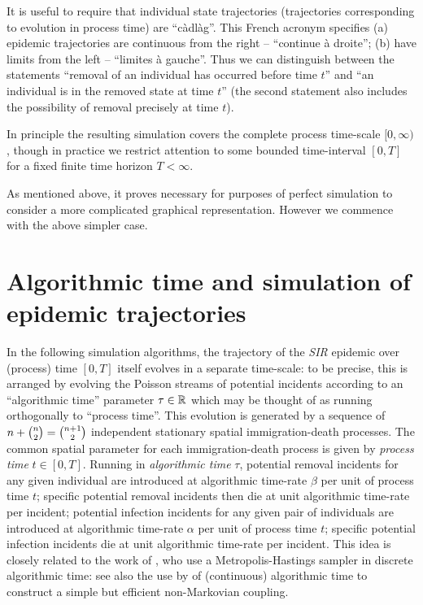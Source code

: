 \documentclass[]{article}
\newcommand{\SIR}{\emph{SIR}\xspace}
\begin{document}
 
It is useful to
 require that
 individual state trajectories 
 (trajectories corresponding to evolution in process time)
 are ``c\`adl\`ag''. 
This French acronym specifies (a) epidemic trajectories are continuous 
 from the right -- ``continue \`a droite'';
(b) have limits from the left -- ``limites \`a gauche''.
Thus we can distinguish between
 the statements
 ``removal of an individual has occurred before time \(t\)''
 and ``an individual is in the removed state 
 at time \(t\)'' (the second statement also
 includes the possibility of removal precisely at time \(t\)).
 
In principle the resulting simulation covers the complete process time-scale \([0,\infty)\),
 though
 in practice we 
 restrict attention to some bounded time-interval \([0,T]\) for a fixed 
 finite time horizon \(T<\infty\).


  As mentioned above, 
  it proves necessary 
  for purposes of perfect simulation
  to consider a more complicated graphical representation.
 However we commence with the above simpler case.
 
 \section{Algorithmic time and simulation of epidemic trajectories}\label{sec:algorithmic}
%
In the following simulation algorithms,
the trajectory of the \SIR epidemic over (process) time \([0,T]\)
itself evolves in a separate time-scale:
to be precise, this is arranged by evolving
the Poisson streams of potential incidents 
according
 to an ``algorithmic time'' parameter \(\tau\in\mathbb{R}\)
 which may be thought of as running orthogonally to ``process time''.
 This evolution is generated by
 a sequence of
 \(n+\tbinom{n}{2}=\tbinom{n+1}{2}\) 
 independent stationary 
 spatial immigration-death processes.
 The common spatial parameter for
 each immigration-death process
 is given by  \emph{process time} \(t\in[0,T]\).
 Running in 
 \emph{algorithmic
 time} \(\tau\), potential removal incidents for any given individual 
 are introduced at algorithmic time-rate \(\beta\) per unit of process time \(t\);
specific potential removal incidents then die at unit algorithmic time-rate per incident;
 potential infection incidents for any given pair of individuals are introduced 
 at algorithmic time-rate \(\alpha\) per unit of process time \(t\); 
specific potential infection incidents die at unit algorithmic time-rate per incident.%
This idea is closely related to the work of 
\citet{GibsonRenshaw-1998,GibsonRenshaw-2001}, who use a Metropolis-Hastings sampler
in discrete algorithmic time:
see also the use
by \cite{BanerjeeKendall-2015}
of (continuous) algorithmic time 
to construct a simple but 
 efficient non-Markovian coupling.%
 
\end{document}
